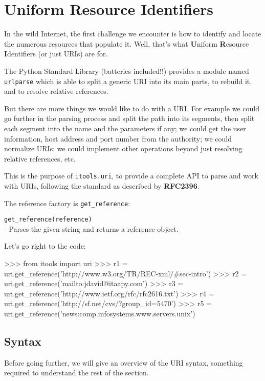 
\chapter{Uniform Resource Identifiers}

In the wild Internet, the first challenge we encounter is how to identify
and locate the numerous resources that populate it. Well, that's what
{\bf U}niform {\bf R}esource {\bf I}dentifiers (or just URIs) are for.

The Python Standard Library (batteries included!!) provides a module named
{\tt urlparse} which is able to split a generic URI into its main parts,
to rebuild it, and to resolve relative references.

But there are more things we would like to do with a URI. For example we
could go further in the parsing process and split the path into its segments,
then split each segment into the name and the parameters if any; we could
get the user information, host address and port number from the authority;
we could normalize URIs; we could implement other operations beyond just
resolving relative references, etc.

This is the purpose of {\tt itools.uri}, to provide a complete API to parse
and work with URIs, following the standard as described by {\bf RFC2396}.

The reference factory is {\tt get\_reference}:

\begin{api}
    {\tt get\_reference(reference)}\\
    - Parses the given string and returns a reference object.
\end{api}

Let's go right to the code:

\begin{code}
    >>> from itools import uri
    >>> r1 = uri.get_reference('http://www.w3.org/TR/REC-xml/#sec-intro')
    >>> r2 = uri.get_reference('mailto:jdavid@itaapy.com')
    >>> r3 = uri.get_reference('http://www.ietf.org/rfc/rfc2616.txt')
    >>> r4 = uri.get_reference('http://sf.net/cvs/?group_id=5470')
    >>> r5 = uri.get_reference('news:comp.infosystems.www.servers.unix')
\end{code}


\section{Syntax}

Before going further, we will give an overview of the URI syntax, something
required to understand the rest of the section.

